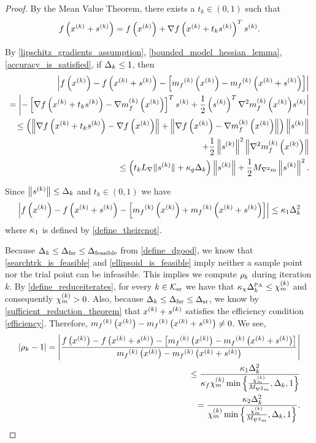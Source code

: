 \begin{proof}

By the Mean Value Theorem, there exists a $t_k \in (0, 1)$ such that
\begin{align*}
f\left(x^{(k)} + {{s}^{(k)}}\right) = f\left(x^{(k)}\right) + \nabla f\left(x^{(k)} + t_k{{s}^{(k)}}\right)^T{{s}^{(k)}}.
\end{align*}

By \cref{lipschitz_gradients_assumption}, \cref{bounded_model_hessian_lemma}, \cref{accuracy_is_satisfied}, if $\Delta_k \le 1$, then
\begin{align*}
\left|f\left(x^{(k)}\right) - f\left(x^{(k)} + {{s}^{(k)}}\right) - \left[{{m}_f}^{(k)}\left(x^{(k)}\right) - {{m}_f}^{(k)}\left(x^{(k)} + {{s}^{(k)}}\right)\right]\right| \\
= \left|-\left[\nabla f\left(x^{(k)} + t_k{{s}^{(k)}}\right) - {\nabla m_f^{(k)}\left(x^{(k)}\right)}\right]^T{{s}^{(k)}} + \frac 1 2 \left({{s}^{(k)}}\right)^T {\nabla^2m_f^{(k)}\left(x^{(k)}\right)} {{s}^{(k)}}\right| \\
\le \left(\left\| \nabla f\left(x^{(k)} + t_k{{s}^{(k)}}\right) - \nabla f\left(x^{(k)}\right) \right\| 
+ \left\| \nabla f\left(x^{(k)}\right)-{\nabla m_f^{(k)}\left(x^{(k)}\right)} \right\|\right) \left\|{{s}^{(k)}}\right\| \\
+ \frac 1 2 \left\|{{s}^{(k)}}\right\|^2\left\|{\nabla^2m_f^{(k)}\left(x^{(k)}\right)}\right\| \\
\le \left(t_k {L_{\nabla}} \|{{s}^{(k)}}\| + \kappa_{g}\Delta_k\right) \left\|{{s}^{(k)}}\right\| + \frac 1 2 {M_{\nabla^2 m}} \left\|{{s}^{(k)}}\right\|^2.
\end{align*}

Since $\left\| {{s}^{(k)}} \right\| \le \Delta_k$ and $t_k \in (0, 1)$ we have
\begin{align*}
\left|f\left(x^{(k)}\right) - f\left(x^{(k)} + {{s}^{(k)}}\right) - \left[{{m}_f}^{(k)}\left(x^{(k)}\right) + {{m}_f}^{(k)}\left(x^{(k)} + {{s}^{(k)}}\right)\right]\right| \le {\kappa_1} \Delta_k^2
\end{align*}
where ${\kappa_1}$ is defined by \cref{define_theircnot}.

Because $\Delta_k \le \Delta_{\textrm{fsr}} \le {\Delta_{\textrm{feasible}}}$ from \cref{define_dgood}, 
we know that
\cref{searchtrk_is_feasible} and \cref{ellipsoid_is_feasible} imply neither a sample point nor the trial point can be infeasible.
This implies we compute $\rho_k$ during iteration $k$.
By \cref{define_reduceiterates}, for every $k \in {\mathcal K_{\textrm{sr}}}$ we have that $\kappa_{\chi}\Delta_k^{p_{\Delta}} \le {\chi_m^{(k)}}$ and consequently ${\chi_m^{(k)}} > 0$.
Also, because $\Delta_k \le \Delta_{\textrm{fsr}} \le {\Delta_{\textrm{sr}}}$, we know by \cref{sufficient_reduction_theorem} that $x^{(k)} + {{s}^{(k)}}$ satisfies the efficiency condition \cref{efficiency}.
Therefore, ${{m}_f}^{(k)}\left(x^{(k)}\right) - {{m}_f}^{(k)}\left(x^{(k)} + {{s}^{(k)}}\right) \ne 0$.
We see,
\begin{align*}
\left|\rho_k - 1\right| 
= \left|\frac
{f\left(x^{(k)}\right) - f\left(x^{(k)} + {{s}^{(k)}}\right) - \left[{{m}_f}^{(k)}\left(x^{(k)}\right) - {{m}_f}^{(k)}\left(x^{(k)} + {{s}^{(k)}}\right)\right]}
{{{m}_f}^{(k)}\left(x^{(k)}\right) - {{m}_f}^{(k)}\left(x^{(k)} + {{s}^{(k)}}\right)} \right| \\
\le \frac {{\kappa_1} \Delta_k^2} {\kappa_f {\chi_m^{(k)}} \min\left\{\frac{{\chi_m^{(k)}}}{{M_{\nabla^2 m}}}, \Delta_k, 1\right\}} \\
= \frac {{\kappa_2} \Delta_k^2} {{\chi_m^{(k)}} \min\left\{\frac{{\chi_m^{(k)}}}{{M_{\nabla^2 m}}}, \Delta_k, 1\right\}}.
\end{align*}


\end{proof}
